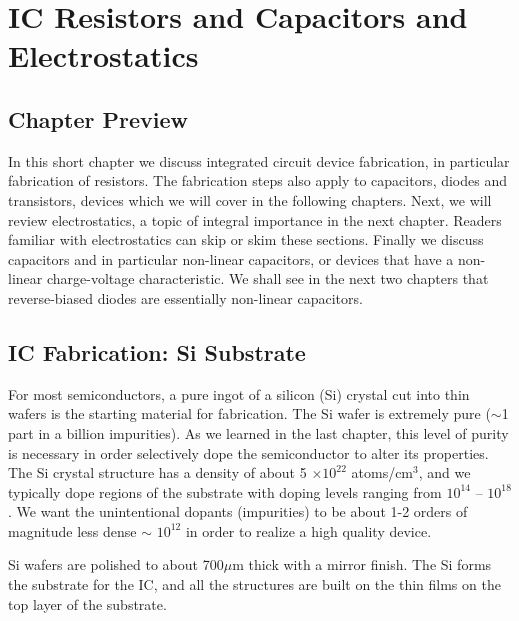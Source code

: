 \graphicspath{{./figs_ic_tech/}}



\chapter{IC Resistors and Capacitors and Electrostatics}






\section{Chapter Preview}

In this short chapter we discuss integrated circuit device fabrication, in particular fabrication of resistors.  The fabrication steps also apply to capacitors, diodes and transistors, devices which we will cover in the following chapters.  Next, we will review electrostatics, a topic of integral importance in the next chapter.  Readers familiar with electrostatics can skip or skim these sections.  Finally we discuss capacitors and in particular non-linear capacitors, or devices that have a non-linear charge-voltage characteristic.  We shall see in the next two chapters that reverse-biased diodes are essentially non-linear capacitors.

 
\section{IC Fabrication: Si Substrate}

For most semiconductors, a pure ingot of a silicon (Si) crystal cut into thin wafers is the starting material for fabrication.  The Si wafer is extremely pure ($\sim$1 part in a billion impurities).  As we learned in the last chapter, this level of purity is necessary in order selectively dope the semiconductor to alter its properties.  The Si crystal structure has a density of about 5 $\times 10^{22}$ atoms/cm$^3$, and we typically dope regions of the substrate with doping levels ranging from  $10^{14}$ – $10^{18}$.  We want the  unintentional dopants (impurities) to be about 1-2 orders of magnitude less dense $\sim$ $10^{12}$ in order to realize a high quality device.  
 
Si wafers are polished to about 700$\mu$m thick with a mirror finish.   The Si forms the substrate for the IC, and all the structures are built on the thin films on the top layer of the substrate.  
 


